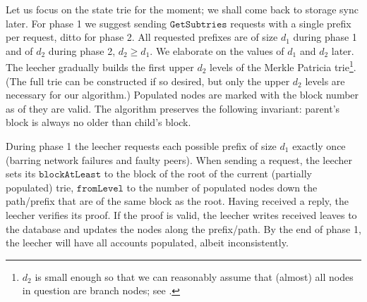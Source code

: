 \documentclass{amsart}
\begin{document}
Let us focus on the state trie for the moment; we shall come back to storage sync later.
For phase 1 we suggest sending $\texttt{GetSubtries}$ requests with a single prefix per request, ditto for phase 2.
All requested prefixes are of size $d_1$ during phase 1 and of $d_2$ during phase 2, $d_2 \geq d_1$.
We elaborate on the values of $d_1$ and $d_2$ later.
The leecher gradually builds the first upper $d_2$ levels of the Merkle Patricia trie\footnote{$d_2$
is small enough so that we can reasonably assume that (almost) all nodes in question are branch nodes;
see \cite{akhunov_1x_workshop_part2}.}.
(The full trie can be constructed if so desired, but only the upper $d_2$ levels are necessary for our algorithm.)
Populated nodes are marked with the block number as of they are valid.
The algorithm preserves the following invariant: parent's block is always no older than child's block.

During phase 1 the leecher requests each possible prefix of size $d_1$ exactly once
(barring network failures and faulty peers).
When sending a request,
the leecher sets its $\texttt{blockAtLeast}$ to the block of the root of the current (partially populated) trie,
$\texttt{fromLevel}$ to the number of populated nodes down the path/prefix that are of the same block as the root.
Having received a reply, the leecher verifies its proof.
If the proof is valid, the leecher writes received leaves to the database and updates the nodes along the prefix/path.
By the end of phase 1, the leecher will have all accounts populated, albeit inconsistently.
\end{document}
